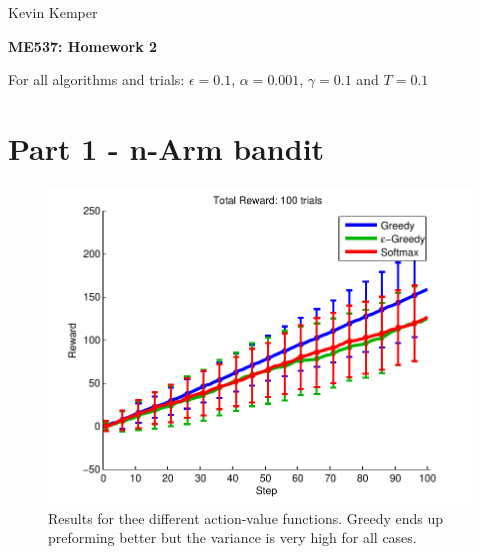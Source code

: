 \documentclass[letterpaper, 11 pt]{article}
\author{Kevin Kemper}
\begin{document}
\begin{flushright}
Kevin Kemper
\end{flushright}

\vspace{-2cm}
\begin{center}
\textbf{\huge ME537: Homework 2}
\end{center}


\thispagestyle{empty}
\pagestyle{empty}




\vspace{0.5cm}

For all algorithms and trials: $\epsilon = 0.1$, $\alpha = 0.001$, $\gamma = 0.1$ and
$T = 0.1$


\section{Part 1 - n-Arm bandit}



\begin{figure}[htb]
	\centering
	\includegraphics[scale=0.6]{../figures/part1.pdf}
	\caption{\small	Results for thee different action-value functions.  Greedy ends up
						preforming better but the variance is very high for all cases.
			}
	\label{fig:pathsa}
\end{figure}
\end{document}
